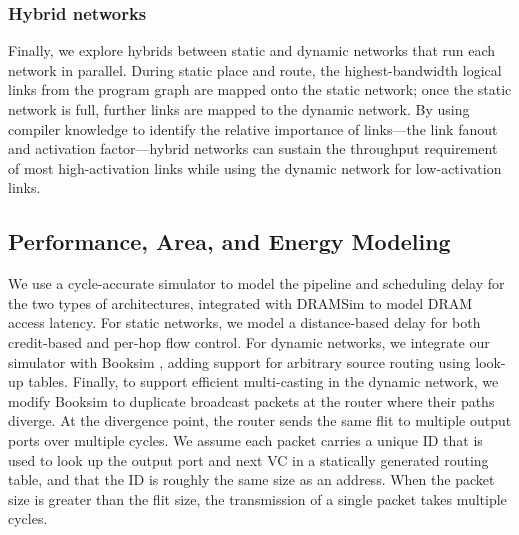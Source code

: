 \subsubsection{Hybrid networks}
Finally, we explore hybrids between static and dynamic networks that run each network in parallel. 
During static place and route, the highest-bandwidth logical links from the program graph are mapped onto the static network; once the static network is full, further links are mapped to the dynamic network.
By using compiler knowledge to identify the relative importance of links---the link fanout and activation factor---hybrid networks can sustain the throughput requirement of most high-activation links while using the dynamic network for low-activation links.

\subsection{Performance, Area, and Energy Modeling} \label{sec:net_char}

We use a cycle-accurate simulator to model the pipeline and scheduling delay for the two types of architectures,
 integrated with DRAMSim \cite{dramsim} to model DRAM access latency. For static networks, we model
a distance-based delay for both credit-based and per-hop flow control. 
For dynamic networks, we integrate
our simulator with Booksim \cite{jiang2013detailed}, adding support for arbitrary source routing using look-up tables. 
Finally, to support efficient multi-casting in the dynamic network, we modify Booksim to duplicate broadcast packets at the router where their paths diverge.
At the divergence point, the router sends the same flit to multiple output ports over multiple cycles.
We assume each packet carries a unique ID that is used to look up the output port and next VC in a statically generated routing table, and that the ID is roughly the same size as an address.
When the packet size is greater than the flit size, the transmission of a single packet takes multiple cycles.

